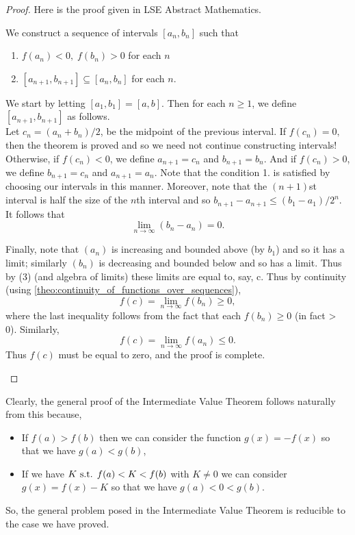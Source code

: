 \documentclass[../MathsNotesBase.tex]{subfiles}
\begin{document}
{\begin{proof}
			Here is the proof given in LSE Abstract Mathematics.\\
			\begin{displayquote}
				We construct a sequence of intervals ${ [a_n, b_n] }$ such that
				\begin{enumerate}
					\item{${ f(a_n) < 0,\; f(b_n) > 0 }$ for each $ n $}
					\item{${ [a_{n+1}, b_{n+1}] \subseteq [a_n, b_n] }$ for each $ n $.}
				\end{enumerate}				
				We start by letting ${ [a_1, b_1] = [a, b]. }$ Then for each ${ n \geq 1 }$, we define ${ [a_{n+1}, b_{n+1}] }$ as follows.\\
				
				Let ${ c_n = (a_n + b_n)/2 }$, be the midpoint of the previous interval. If ${ f(c_n) = 0, }$ then the
				theorem is proved and so we need not continue constructing intervals!\\
				
				Otherwise, if ${ f(c_n) < 0 }$, we define ${ a_{n+1} = c_n }$ and ${ b_{n+1} = b_n }$. And if ${ f(c_n) > 0 }$, we define
				${ b_{n+1} = c_n }$ and ${ a_{n+1} = a_n }$. Note that the condition 1. is satisfied by choosing our intervals in this manner.
				Moreover, note that the ${ (n + 1) }$st interval is half the size of the $n$th interval and so
				${ b_{n+1} - a_{n+1} \leq (b_1 - a_1)/2^n }$. It follows that
				\[ \lim_{n \to \infty} (b_n - a_n) = 0.  \tag{3}\]
				
				Finally, note that $ (a_n) $ is increasing and bounded above (by $ b_1 $) and so it has a limit; similarly $ (b_n) $ is decreasing and bounded below and so has a limit. Thus by (3) (and algebra of limits) these limits are equal to, say, c. Thus by continuity (using \autoref{theo:continuity_of_functions_over_sequences}),
				\[ f(c) = \lim_{n \to \infty} f(b_n) \geq 0, \]
				where the last inequality follows from the fact that each ${ f(b_n) \geq 0 }$ (in fact > 0). Similarly,
				\[ f(c) = \lim_{n \to \infty} f(a_n) \leq 0. \]
				Thus $ f(c) $ must be equal to zero, and the proof is complete.
			\end{displayquote}
		\end{proof}
		Clearly, the general proof of the Intermediate Value Theorem follows naturally from this because,
		\begin{itemize}
			\item{If ${ f(a) > f(b) }$ then we can consider the function ${ g(x) = -f(x) }$ so that we have ${ g(a) < g(b) }$,}
			\item{If we have ${ K \text{ s.t. } f(a) < K < f(b) }$ with ${ K \neq 0 }$ we can consider ${ g(x) = f(x) - K }$ so that we have ${ g(a) < 0 < g(b) }$.}
		\end{itemize}
		So, the general problem posed in the Intermediate Value Theorem is reducible to the case we have proved.
		
}
\end{document}
